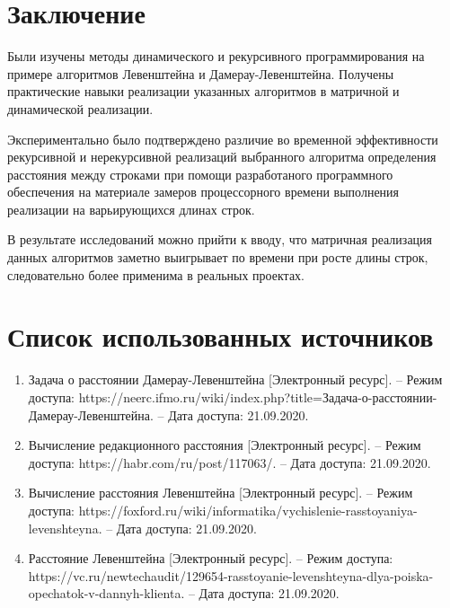 \documentclass[12pt]{report}
\begin{document}
\chapter*{Заключение}
Были изучены методы динамического и рекурсивного программирования на примере алгоритмов Левенштейна и Дамерау-Левенштейна.
Получены практические навыки реализации указанных алгоритмов в матричной и динамической реализации.

Экспериментально было подтверждено различие во временной эффективности рекурсивной и нерекурсивной реализаций выбранного алгоритма определения расстояния между строками при помощи разработаного программного обеспечения на материале замеров процессорного времени выполнения реализации на варьирующихся длинах строк. 

В результате исследований можно прийти к вводу, что матричная реализация данных алгоритмов заметно выигрывает по времени при росте длины строк, следовательно более применима в реальных проектах.


\chapter*{Список использованных источников}
\begin{enumerate}
	\item Задача о расстоянии Дамерау-Левенштейна [Электронный ресурс]. – Режим доступа: https://neerc.ifmo.ru/wiki/index.php?title=Задача-о-расстоянии-Дамерау-Левенштейна. – Дата доступа: 21.09.2020.
	\item Вычисление редакционного расстояния [Электронный ресурс]. – Режим доступа: https://habr.com/ru/post/117063/. – Дата доступа: 21.09.2020.
	\item Вычисление расстояния Левенштейна [Электронный ресурс]. – Режим доступа: https://foxford.ru/wiki/informatika/vychislenie-rasstoyaniya-levenshteyna. – Дата доступа: 21.09.2020.
	\item Расстояние Левенштейна [Электронный ресурс]. – Режим доступа: https://vc.ru/newtechaudit/129654-rasstoyanie-levenshteyna-dlya-poiska-opechatok-v-dannyh-klienta. – Дата доступа: 21.09.2020.
\end{enumerate}
\end{document}
